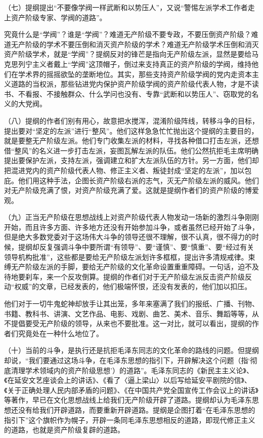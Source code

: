 （七）提纲提出“不要像学阀一样武断和以势压人”，又说“警惕左派学术工作者走上资产阶级专家、学阀的道路”。

究竟什么是“学阀”？谁是“学阀”？难道无产阶级不要专政，不要压倒资产阶级？难道无产阶级的学术不要压倒和消灭资产阶级的学术？难道无产阶级学术压倒和消灭资产阶级学术，就是“学阀”？提纲反对的锋芒是指向无产阶级左派，显然是要给马克思列宁主义者戴上“学阀”这顶帽子，倒过来支持真正的资产阶级的学阀，维持他们在学术界的摇摇欲坠的垄断地位。其实，那些支持资产阶级学阀的党内走资本主义道路的当权派，那些钻进党内保护资产阶级学阀的资产阶级代表人物，才是不读书、不看报、不接触群众、什么学问也没有、专靠“武断和以势压人”、窃取党的名义的大党阀。

（八）提纲的作者们别有用心，故意把水搅浑，混淆阶级阵线，转移斗争的目标，提出要对“坚定的左派”进行“整风”。他们这样急急忙忙抛出这个提纲的主要目的，就是要整无产阶级左派。他们专门收集左派的材料，寻找各种借口打击左派，还想借“整风”的名义进一步打击左派，妄图瓦解左派的队伍。他们公然抗拒毛主席明确提出要保护左派，支持左派，强调建立和扩大左派队伍的方针。另一方面，他们却把混进党内的资产阶级代表人物、修正主义者、叛徒封成“坚定的左派”，加以包庇。他们用这种手法，企图长资产阶级右派的志气，灭无产阶级左派的威风。他们对无产阶级充满了恨，对资产阶级充满了爱。这就是提纲作者们的资产阶级的博爱观。

（九）正当无产阶级在思想战线上对资产阶级代表人物发动一场新的激烈斗争刚刚开始，而且许多方面、许多地方还没有开始参加斗争，或者虽然已经开始了斗争，但是绝大多数党委对于这场伟大斗争的领导还很不理解，很不认真，很不得力的时候，提纲却反复强调斗争中要所谓“有领导”、要“谨慎”、要“慎重”、要“经过有关领导机构批准”，这些都是要给无产阶级左派划许多框框，提出许多清规戒律。束缚无产阶级左派的手脚，要给无产阶级的文化革命设置重重障碍。一句话，迫不及待地要刹车，来一个反攻倒算。提纲的作者们对于无产阶级左派反击资产阶级反动“权威”的文章，已经发表的，他们极端怀恨，还没有发表的，他们加以扣压。

他们对于一切牛鬼蛇神却放手让其出笼，多年来塞满了我们的报纸、广播、刊物、书籍、教科书、讲演、文艺作品、电影、戏剧、曲艺、美术、音乐、舞蹈等等，从不提倡要受无产阶级的领导，从来也不要批准。这一对比，就可以看出，提纲的作者们究竟处在一种什么地位了。

（十）当前的斗争，是执行还是抗拒毛泽东同志的文化革命的路线的问题。但提纲却说，“我们要通过这场斗争，在毛泽东思想的指引下，开辟解决这个问题（指‘彻底清理学术领域内的资产阶级思想’）的道路”。毛泽东同志的《新民主主义论》、《在延安文艺座谈会上的讲话》、《看了〈逼上梁山〉以后写给延安平剧院的信》、《关于正确处理人民内部矛盾的问题》、《在中国共产党全国宣传工作会议上的讲话》等著作，早已在文化思想战线上给我们无产阶级开辟了道路。提纲却认为毛泽东思想还没有给我们开辟道路，而要重新开辟道路。提纲是企图打着“在毛泽东思想的指引下”这个旗帜作为幌子，开辟一条同毛泽东思想相反的道路，即现代修正主义的道路，也就是资产阶级复辟的道路。

